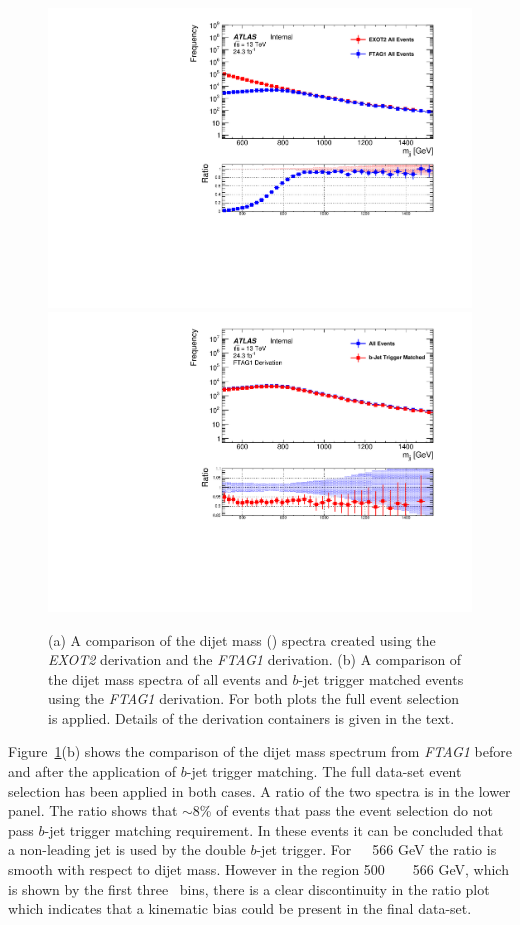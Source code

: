 \begin{figure}[!ht]
  \begin{center}
    \captionsetup[subfigure]{aboveskip=0pt,justification=centering}
    \subcaptionbox{} {\includegraphics[width=0.5\linewidth, angle=0]{figs/Dibjet/LowMass/evt-trigmatch_exot2.pdf} }\hspace{-5mm}
    \subcaptionbox{} {\includegraphics[width=0.5\linewidth, angle=0]{figs/Dibjet/LowMass/evt-trigmatch_ftag1.pdf} }
  \end{center}
  \caption{(a) A comparison of the dijet mass (\mjj) spectra created using the \textit{EXOT2} derivation and the \textit{FTAG1} derivation.
    (b) A comparison of the dijet mass spectra of all events and $b$-jet trigger matched events using the \textit{FTAG1} derivation.
    For both plots the full \lm{} event selection is applied. Details of the derivation containers is given in the text. }
     \label{fig:evt-btrig_match}
\end{figure}

Figure~\ref{fig:evt-btrig_match}(b) shows the comparison of the dijet mass spectrum from \textit{FTAG1}
before and after the application of $b$-jet trigger matching.
The full \lm{} data-set event selection has been applied in both cases.
A ratio of the two spectra is in the lower panel.
The ratio shows that $\sim$8\% of events that
pass the \lm{} event selection do not pass $b$-jet trigger matching requirement.
In these events it can be concluded that a non-leading jet is used by the double $b$-jet trigger.
For~\mjj~\gt~566 GeV the ratio is smooth with respect to dijet mass.
However in the region 500~\lt~\mjj~\lt~566 GeV, which is shown by the first three \mjj{}~bins,
there is a clear discontinuity in the ratio plot
which indicates that a kinematic bias could be present in the final data-set.

